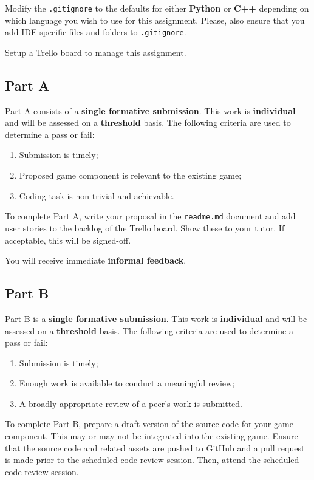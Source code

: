 \documentclass{../fal_assignment}
\begin{document}
Modify the \texttt{.gitignore} to the defaults for either \textbf{Python} or \textbf{C++} depending on which language you wish to use for this assignment. Please, also ensure that you add IDE-specific files and folders to \texttt{.gitignore}. 

Setup a Trello board to manage this assignment. 

\subsection*{Part A}

Part A consists of a \textbf{single formative submission}. This work is \textbf{individual} and will be assessed on a \textbf{threshold} basis. The following criteria are used to determine a pass or fail:

\begin{enumerate}[label=(\alph*)]
	\item Submission is timely;
	\item Proposed game component is relevant to the existing game;
	\item Coding task is non-trivial and achievable.
\end{enumerate}

To complete Part A, write your proposal in the \texttt{readme.md} document and add user stories to the backlog of the Trello board. Show these to your tutor.  If acceptable, this will be signed-off. 

You will receive immediate \textbf{informal feedback}.

\subsection*{Part B}

Part B is a \textbf{single formative submission}. This work is \textbf{individual} and will be assessed on a \textbf{threshold} basis. The following criteria are used to determine a pass or fail:

\begin{enumerate}[label=(\alph*)]
	\item Submission is timely;
	\item Enough work is available to conduct a meaningful review;
	\item A broadly appropriate review of a peer's work is submitted.
\end{enumerate}

To complete Part B, prepare a draft version of the source code for your game component. This may or may not be integrated into the existing game. Ensure that the source code and related assets are pushed to GitHub and a pull request is made prior to the scheduled code review session. Then, attend the scheduled code review session.
\end{document}
